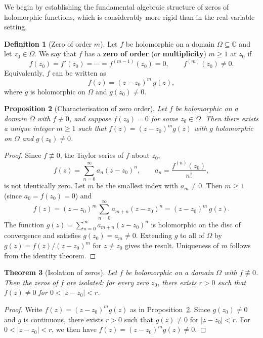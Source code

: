 \documentclass[12pt,a4paper,openany]{book}
\theoremstyle{definition}
\newtheorem{definition}{Definition}[chapter]
\theoremstyle{plain}
\newtheorem{theorem}[definition]{Theorem}
\newtheorem{proposition}[definition]{Proposition}
\theoremstyle{remark}
\newcommand{\C}{\mathbb{C}}
\newcommand{\abs}[1]{\left|#1\right|}
\begin{document}
We begin by establishing the fundamental algebraic structure
of zeros of holomorphic functions, which is considerably more
rigid than in the real-variable setting.

\begin{definition}[Zero of order $m$]\label{def:zero-order}
Let $f$ be holomorphic on a domain $\Omega \subseteq \C$ and let $z_0 \in \Omega$.
We say that $f$ has a \textbf{zero of order}
(or \textbf{multiplicity}) $m \geq 1$ at $z_0$ if
\[
  f(z_0) = f'(z_0) = \cdots = f^{(m-1)}(z_0) = 0, \qquad f^{(m)}(z_0) \neq 0.
\]
Equivalently, $f$ can be written as
\[
  f(z) = (z - z_0)^m \, g(z),
\]
where $g$ is holomorphic on $\Omega$ and $g(z_0) \neq 0$.
\end{definition}

\begin{proposition}[Characterisation of zero order]\label{prop:zero-order-char}
Let $f$ be holomorphic on a domain $\Omega$ with $f \not\equiv 0$, and
suppose $f(z_0) = 0$ for some $z_0 \in \Omega$. Then there exists a
unique integer $m \geq 1$ such that $f(z) = (z-z_0)^m g(z)$ with
$g$ holomorphic on $\Omega$ and $g(z_0) \neq 0$.
\end{proposition}

\begin{proof}
Since $f \not\equiv 0$, the Taylor series of $f$ about $z_0$,
\[
  f(z) = \sum_{n=0}^{\infty} a_n (z - z_0)^n,
  \qquad a_n = \frac{f^{(n)}(z_0)}{n!},
\]
is not identically zero. Let $m$ be the smallest index with $a_m \neq 0$.
Then $m \geq 1$ (since $a_0 = f(z_0) = 0$) and
\[
  f(z) = (z - z_0)^m \sum_{n=0}^{\infty} a_{m+n} (z-z_0)^n
  = (z-z_0)^m \, g(z).
\]
The function $g(z) = \sum_{n=0}^{\infty} a_{m+n}(z-z_0)^n$ is
holomorphic on the disc of convergence and satisfies
$g(z_0) = a_m \neq 0$. Extending $g$ to all of $\Omega$ by
$g(z) = f(z)/(z-z_0)^m$ for $z \neq z_0$ gives the result.
Uniqueness of $m$ follows from the identity theorem.
\end{proof}

\begin{theorem}[Isolation of zeros]\label{thm:isolated-zeros}
Let $f$ be holomorphic on a domain $\Omega$ with $f \not\equiv 0$.
Then the zeros of $f$ are isolated: for every zero $z_0$,
there exists $r > 0$ such that $f(z) \neq 0$ for
$0 < \abs{z - z_0} < r$.
\end{theorem}

\begin{proof}
Write $f(z) = (z-z_0)^m g(z)$ as in Proposition~\ref{prop:zero-order-char}.
Since $g(z_0) \neq 0$ and $g$ is continuous, there exists $r > 0$
such that $g(z) \neq 0$ for $\abs{z-z_0} < r$. For $0 < \abs{z-z_0} < r$,
we then have $f(z) = (z-z_0)^m g(z) \neq 0$.
\end{proof}
\end{document}
